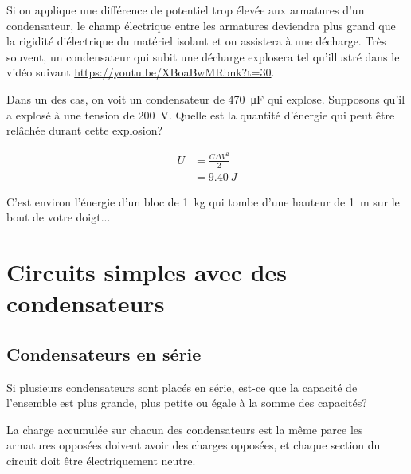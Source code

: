 
Si on applique une différence de potentiel trop élevée aux armatures d'un
condensateur, le champ électrique entre les armatures deviendra plus grand que
la rigidité diélectrique du matériel isolant et on assistera à une décharge.
Très souvent, un condensateur qui subit une décharge explosera tel qu'illustré
dans le vidéo suivant \url{https://youtu.be/XBoaBwMRbnk?t=30}.


\begin{diapobox}
Dans un des cas, on voit un condensateur de \SI{470}{\micro\farad} qui explose.
Supposons qu'il a explosé à une tension de \SI{200}{\volt}. Quelle est la
quantité d'énergie qui peut être relâchée durant cette explosion?
\end{diapobox}

\begin{reponsebox}
\begin{align*}
  U &= \frac{C\Delta V^2}{2}  \\
    &= \SI{9.40}{J}
\end{align*}

C'est environ l'énergie d'un bloc de \SI{1}{kg} qui tombe d'une hauteur de
\SI{1}{m} sur le bout de votre doigt...
\end{reponsebox}



\section{Circuits simples avec des condensateurs}


\subsection*{Condensateurs en série}


Si plusieurs condensateurs sont placés en série, est-ce que la capacité de
l'ensemble est plus grande, plus petite ou égale à la somme des capacités?

La charge accumulée sur chacun des condensateurs est la même parce les
armatures opposées doivent avoir des charges opposées, et chaque section du
circuit doit être électriquement neutre.

